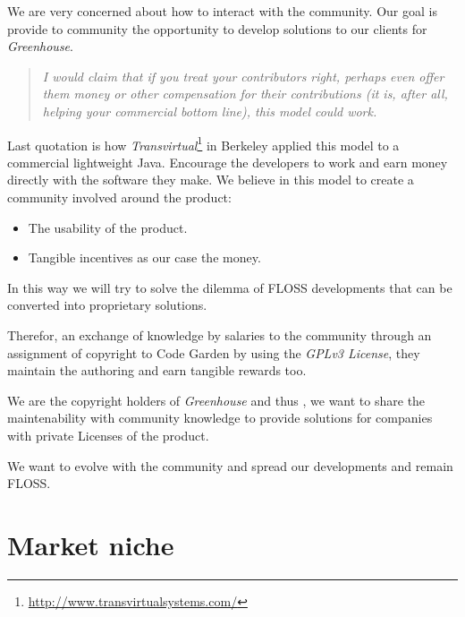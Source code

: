 \documentclass[11pt]{scrartcl}
\begin{document}
\par We are very concerned about how to interact with the community. Our goal is provide to community the opportunity to develop solutions to our clients for \emph{Greenhouse}.

\begin{quotation}
    \emph{I would claim that if you treat your contributors right, perhaps even offer them money or other compensation for their contributions (it is, after all, helping your commercial bottom line), this model could work.}
\end{quotation}

\par Last quotation is how \emph{Transvirtual}\footnote{\url{http://www.transvirtualsystems.com/}} in Berkeley applied this model to a commercial lightweight Java. Encourage the developers to work and earn money directly with the software they make. We believe in this model to create a community involved around the product: 

\begin{itemize}
	\item The usability of the product.
	\item Tangible incentives as our case the money.
\end{itemize}

\par In this way we will try to solve the dilemma of FLOSS developments that can be converted into proprietary solutions.

\par Therefor, an exchange of knowledge by salaries to the community through an assignment of copyright to Code Garden by using the \emph{GPLv3 License}, they maintain the authoring and earn tangible rewards too.

\par We are the copyright holders of \emph{Greenhouse} and thus , we want to share the maintenability with community knowledge to provide solutions for companies with private Licenses of the product.

\par We want to evolve with the community and spread our developments and remain FLOSS.

\section{Market niche}
\label{sec:market-niche}
\end{document}
